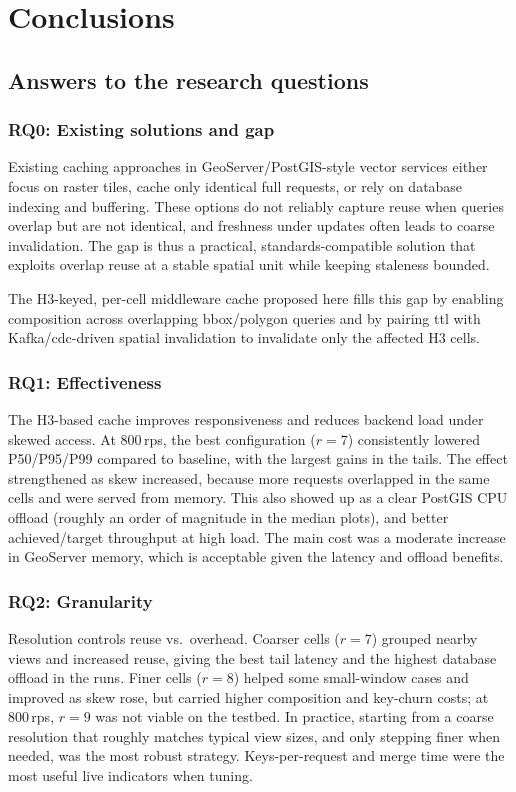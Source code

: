 \section{Conclusions}

\subsection{Answers to the research questions}

\subsubsection{RQ0: Existing solutions and gap}
Existing caching approaches in GeoServer/PostGIS-style vector services either focus on raster tiles, cache only identical full requests, or rely on database indexing and buffering. These options do not reliably capture reuse when queries overlap but are not identical, and freshness under updates often leads to coarse invalidation. The gap is thus a practical, standards-compatible solution that exploits overlap reuse at a stable spatial unit while keeping staleness bounded.

The H3-keyed, per-cell middleware cache proposed here fills this gap by enabling composition across overlapping \ac{bbox}/polygon queries and by pairing \ac{ttl} with Kafka/\ac{cdc}-driven spatial invalidation to invalidate only the affected H3 cells.

\subsubsection{RQ1: Effectiveness}
The H3-based cache improves responsiveness and reduces backend load under skewed access. At 800\,\ac{rps}, the best configuration ($r{=}7$) consistently lowered P50/P95/P99 compared to baseline, with the largest gains in the tails. The effect strengthened as skew increased, because more requests overlapped in the same cells and were served from memory. This also showed up as a clear PostGIS CPU offload (roughly an order of magnitude in the median plots), and better achieved/target throughput at high load. The main cost was a moderate increase in GeoServer memory, which is acceptable given the latency and offload benefits.

\subsubsection{RQ2: Granularity}
Resolution controls reuse vs.\ overhead. Coarser cells ($r{=}7$) grouped nearby views and increased reuse, giving the best tail latency and the highest database offload in the runs. Finer cells ($r{=}8$) helped some small-window cases and improved as skew rose, but carried higher composition and key-churn costs; at 800\,\ac{rps}, $r{=}9$ was not viable on the testbed. In practice, starting from a coarse resolution that roughly matches typical view sizes, and only stepping finer when needed, was the most robust strategy. Keys-per-request and merge time were the most useful live indicators when tuning.

